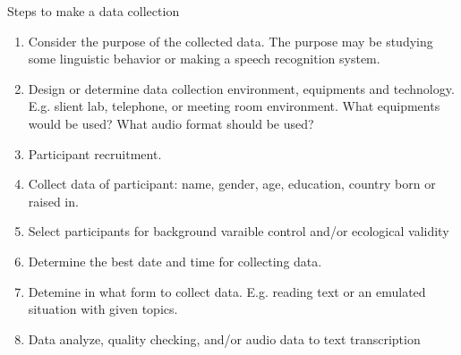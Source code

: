 \documentclass[12pt]{article}
\newenvironment{problem}[2][Problem]{\begin{trivlist}
\item[\hskip \labelsep {\bfseries #1}\hskip \labelsep {\bfseries #2.}]}{\end{trivlist}}
\begin{document}
\begin{problem}{4.1}
    Steps to make a data collection
    \begin{enumerate}
        \item Consider the purpose of the collected data. The purpose may be
        studying some linguistic behavior or making a speech recognition system.
        \item Design or determine data collection environment, equipments and technology.
        E.g. slient lab, telephone, or meeting room environment.
        What equipments would be used? What audio format should be used?
        \item Participant recruitment.
        \item Collect data of participant: name, gender, age, education, country born or raised in.
        \item Select participants for background varaible control and/or ecological validity
        \item Determine the best date and time for collecting data.
        \item Detemine in what form to collect data.
        E.g. reading text or an emulated situation with given topics.
        \item Data analyze, quality checking, and/or audio data to text transcription
    \end{enumerate}
\end{problem}
\pagebreak
\end{document}
